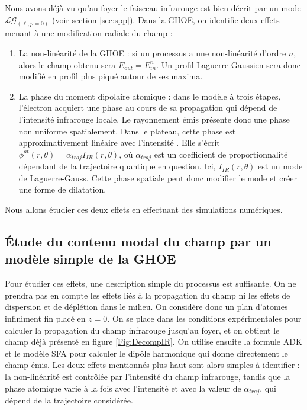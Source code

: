 Nous avons déjà vu qu'au foyer le faisceau infrarouge est bien décrit par un mode $\mathcal{LG}_{(\ell,p=0)}$ (voir section \ref{sec:spp}). Dans la GHOE, on identifie deux effets menant à une modification radiale du champ : 
\begin{enumerate}
\item La non-linéarité de la GHOE : si un processus a une non-linéarité d'ordre $n$, alors le champ obtenu sera $E_{out}=E_{in}^n$. Un profil Laguerre-Gaussien sera donc modifié en profil plus piqué autour de ses maxima.

\item La phase du moment dipolaire atomique : dans le modèle à trois étapes, l'électron acquiert une phase au cours de sa propagation qui dépend de l'intensité infrarouge locale. Le rayonnement émis présente donc une phase non uniforme spatialement. Dans le plateau, cette phase est approximativement linéaire avec l'intensité . Elle s'écrit $\phi^{at}(r,\theta) = \alpha_{traj} I_{IR}(r,\theta)$, où $\alpha_{traj}$ est un coefficient de proportionnalité dépendant de la trajectoire quantique en question. Ici, $I_{IR}(r,\theta)$ est un mode de Laguerre-Gauss. Cette phase spatiale peut donc modifier le mode et créer une forme de dilatation.
\end{enumerate}
Nous allons étudier ces deux effets en effectuant des simulations numériques.

\subsection{\'{E}tude du contenu modal du champ par un modèle simple de la GHOE}
Pour étudier ces effets, une description simple du processus est suffisante. On ne prendra pas en compte les effets liés à la propagation du champ ni les effets de dispersion et de déplétion dans le milieu. On considère donc un plan d'atomes infiniment fin placé en $z=0$. On se place dans les conditions expérimentales pour calculer la propagation du champ infrarouge jusqu'au foyer, et on obtient le champ déjà présenté en figure \ref{Fig:DecompIR}. On utilise ensuite la formule ADK  et le modèle SFA  pour calculer le dipôle harmonique qui donne directement le champ émis. Les deux effets mentionnés plus haut sont alors simples à identifier : la non-linéarité est contrôlée par l'intensité du champ infrarouge, tandis que la phase atomique varie à la fois avec l'intensité et avec la valeur de $\alpha_{traj}$, qui dépend de la trajectoire considérée.

